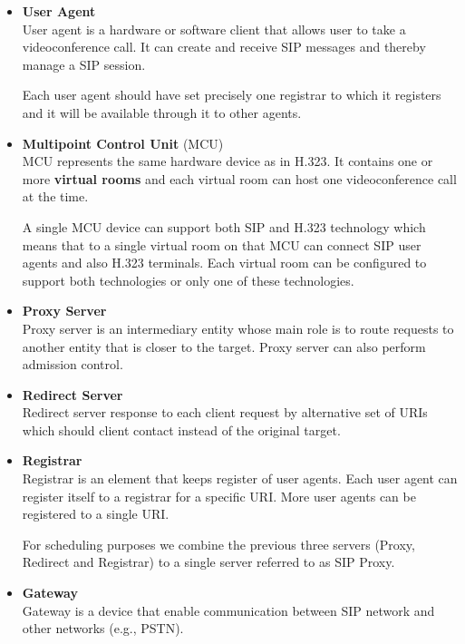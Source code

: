 \begin{itemize}
\item \textbf{User Agent} \\
User agent is a hardware or software client that allows user to take a 
videoconference call. It can create and receive SIP messages and thereby
manage a SIP session.

Each user agent should have set precisely one registrar to which it registers 
and it will be available through it to other agents.

\item \textbf{Multipoint Control Unit} (MCU) \\
MCU represents the same hardware device as in H.323. It contains one or more 
\textbf{virtual rooms} and each virtual room can host one videoconference call 
at the time.

A single MCU device can support both SIP and H.323 technology which means that 
to a single virtual room on that MCU can connect SIP user agents and also 
H.323 terminals. Each virtual room can be configured to support both 
technologies or only one of these technologies.

\item \textbf{Proxy Server} \\
Proxy server is an intermediary entity whose main role is to route requests to 
another entity that is closer to the target. Proxy server can also perform 
admission control.

\item \textbf{Redirect Server} \\
Redirect server response to each client request by alternative set of URIs 
which should client contact instead of the original target.

\item \textbf{Registrar} \\
Registrar is an element that keeps register of user agents. Each user agent 
can register itself to a registrar for a specific URI. More user agents can be 
registered to a single URI. 

For scheduling purposes we combine the previous three servers (Proxy, Redirect 
and Registrar) to a single server referred to as SIP Proxy.

\item \textbf{Gateway} \\
Gateway is a device that enable communication between SIP network and other 
networks (e.g., PSTN).
\end{itemize}

